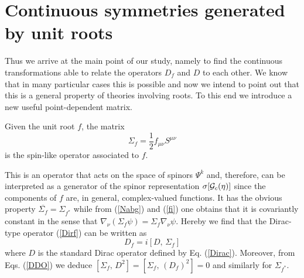 \documentclass[a4paper,12pt]{article}
\begin{document}
\section{Continuous symmetries generated by unit roots} 

Thus we arrive at the main point of our study, namely to find the continuous 
transformations able to relate the operators $D_f$ and $D$ to each other. 
We know that in many particular cases \cite{CV1, K2, CV} this is possible 
and now we intend to point out that this is a general property of theories 
involving roots. To this end we introduce a new useful point-dependent matrix.    
\begin{defin}
Given the unit root $f$, the matrix 
\begin{equation}\label{SfS}
\Sigma_{f}=\frac{1}{2}f_{\mu\nu}S^{\mu\nu}
\end{equation}
is the spin-like operator associated to $f$.
\end{defin}
This is an operator that acts on the space of spinors $\Psi^k$ and, therefore, 
can be interpreted as a generator of the spinor representation 
$\sigma[{\cal G}_c(\eta)]$ since the components of $f$ are, in general, 
complex-valued functions.  It has the obvious property $\overline{\Sigma_{f}}= 
\Sigma_{f^*}$ while from (\ref{Nabg}) and (\ref{fi}) one 
obtains that it is covariantly constant in the sense that
$\nabla_{\nu}(\Sigma_f\psi)=\Sigma_f \nabla_{\nu} \psi$.   
Hereby we find that the Dirac-type operator (\ref{Dirf}) can be written as
\begin{equation}\label{DDS}
D_f=i\left[D,\, \Sigma_f\right]
\end{equation}
where $D$ is the standard Dirac operator defined by Eq. (\ref{Dirac}).
Moreover, from Eqs. (\ref{DDO}) we deduce 
$[\Sigma_f,\, D^2]=[\Sigma_f,\,(D_{f})^2]=0$ 
and similarly for $\Sigma_{f^*}$.
\end{document}
